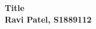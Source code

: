 \documentclass{article}
\begin{document}

\begin{titlepage}
    \vspace*{.5em}
    \center
    \textbf{\Huge{Title}}\\
    \vspace{10mm}
    \textbf{\LARGE{Ravi Patel, S1889112}}\\
    \vspace{15em}
    \vfill
\end{titlepage}

\clearpage

\pagestyle{plain}
\setcounter{page}{1}

\tableofcontents
\clearpage
\end{document}
